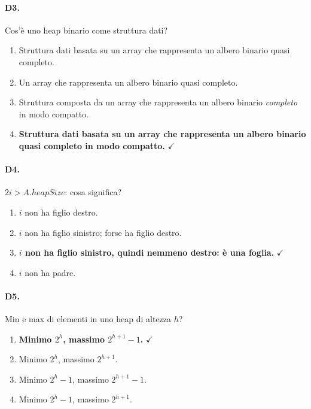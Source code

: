 \paragraph{D3.} Cos'\`e uno heap binario come struttura dati?
\begin{enumerate}[label=\Alph*.,leftmargin=*]
	\item Struttura dati basata su un array che rappresenta un albero binario quasi completo.
	\item Un array che rappresenta un albero binario quasi completo.
	\item Struttura composta da un array che rappresenta un albero binario \emph{completo} in modo compatto.
	\item \textcolor{correctgreen}{\textbf{Struttura dati basata su un array che rappresenta un albero binario quasi completo in modo compatto.}} \hfill\textcolor{correctgreen}{$\checkmark$}
\end{enumerate}

\paragraph{D4.} $2i > A.\mathit{heapSize}$: cosa significa?
\begin{enumerate}[label=\Alph*.,leftmargin=*]
	\item $i$ non ha figlio destro.
	\item $i$ non ha figlio sinistro; forse ha figlio destro.
	\item \textcolor{correctgreen}{\textbf{$i$ non ha figlio sinistro, quindi nemmeno destro: \`e una foglia.}} \hfill\textcolor{correctgreen}{$\checkmark$}
	\item $i$ non ha padre.
\end{enumerate}

\paragraph{D5.} Min e max di elementi in uno heap di altezza $h$?
\begin{enumerate}[label=\Alph*.,leftmargin=*]
	\item \textcolor{correctgreen}{\textbf{Minimo $2^h$, massimo $2^{h+1}-1$.}} \hfill\textcolor{correctgreen}{$\checkmark$}
	\item Minimo $2^h$, massimo $2^{h+1}$.
	\item Minimo $2^h-1$, massimo $2^{h+1}-1$.
	\item Minimo $2^h-1$, massimo $2^{h+1}$.
\end{enumerate}

